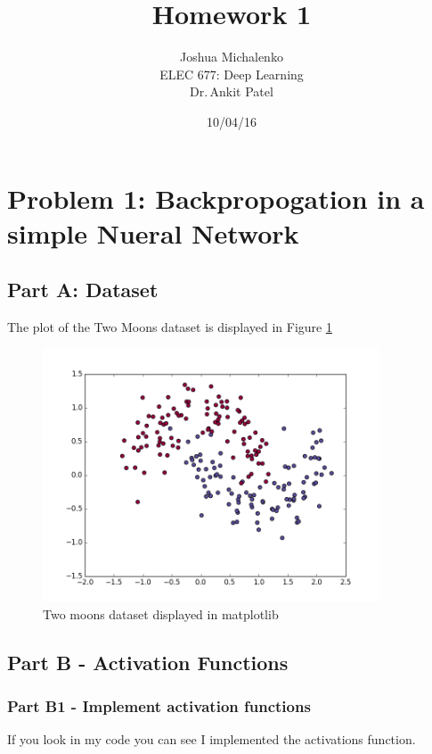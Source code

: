 \documentclass[]{article}
\begin{document}
\title{Homework 1}
\author{Joshua Michalenko\\ ELEC 677: Deep Learning \\  Dr.\,Ankit Patel}
\date{10/04/16}
\maketitle



\section{Problem 1: Backpropogation in a simple Nueral Network}
\subsection{Part A:  Dataset}
The plot of the Two Moons dataset is displayed in Figure \ref{fig:partA}

\begin{figure}[ht]
        \centering
        \includegraphics[width=10cm]{figures/twoMoons.png}

 	\caption{Two moons dataset displayed in matplotlib}

 	 \label{fig:partA}
\end{figure}


\subsection{Part B - Activation Functions}
\subsubsection{Part B1 - Implement activation functions}
If you look in my code you can see I implemented the activations function. 
\end{document}
